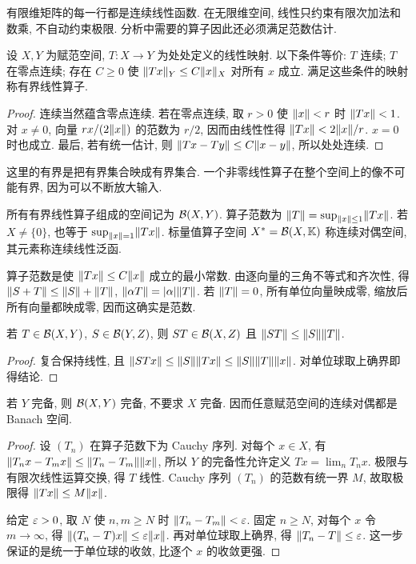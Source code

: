 \label{ch:operators}
有限维矩阵的每一行都是连续线性函数. 在无限维空间, 线性只约束有限次加法和数乘, 不自动约束极限. 分析中需要的算子因此还必须满足范数估计.

\begin{theorem}\label{thm:bounded}
设 $X,Y$ 为赋范空间, $T:X\to Y$ 为处处定义的线性映射. 以下条件等价: $T$ 连续; $T$ 在零点连续; 存在 $C\ge0$ 使 $\lVert Tx\rVert_Y\le C\lVert x\rVert_X$ 对所有 $x$ 成立. 满足这些条件的映射称有界线性算子.
\end{theorem}
\begin{proof}
连续当然蕴含零点连续. 若在零点连续, 取 $r>0$ 使 $\lVert x\rVert<r$ 时 $\lVert Tx\rVert<1$. 对 $x\ne0$, 向量 $rx/(2\lVert x\rVert)$ 的范数为 $r/2$, 因而由线性性得 $\lVert Tx\rVert<2\lVert x\rVert/r$. $x=0$ 时也成立. 最后, 若有统一估计, 则 $\lVert Tx-Ty\rVert\le C\lVert x-y\rVert$, 所以处处连续.
\end{proof}
这里的有界是把有界集合映成有界集合. 一个非零线性算子在整个空间上的像不可能有界, 因为可以不断放大输入.

\begin{definition}
所有有界线性算子组成的空间记为 $\mathcal B(X,Y)$. 算子范数为 $\lVert T\rVert=\sup_{\lVert x\rVert\le1}\lVert Tx\rVert$. 若 $X\ne\{0\}$, 也等于 $\sup_{\lVert x\rVert=1}\lVert Tx\rVert$. 标量值算子空间 $X^*=\mathcal B(X,\mathbb K)$ 称连续对偶空间, 其元素称连续线性泛函.
\end{definition}
算子范数是使 $\lVert Tx\rVert\le C\lVert x\rVert$ 成立的最小常数. 由逐向量的三角不等式和齐次性, 得 $\lVert S+T\rVert\le\lVert S\rVert+\lVert T\rVert$, $\lVert \alpha T\rVert=|\alpha|\lVert T\rVert$. 若 $\lVert T\rVert=0$, 所有单位向量映成零, 缩放后所有向量都映成零, 因而这确实是范数.

\begin{proposition}\label{prop:composition}
若 $T\in\mathcal B(X,Y)$, $S\in\mathcal B(Y,Z)$, 则 $ST\in\mathcal B(X,Z)$ 且 $\lVert ST\rVert\le\lVert S\rVert\lVert T\rVert$.
\end{proposition}
\begin{proof}
复合保持线性, 且 $\lVert STx\rVert\le\lVert S\rVert\lVert Tx\rVert\le\lVert S\rVert\lVert T\rVert\lVert x\rVert$. 对单位球取上确界即得结论.
\end{proof}

\begin{theorem}\label{thm:operatorbanach}
若 $Y$ 完备, 则 $\mathcal B(X,Y)$ 完备, 不要求 $X$ 完备. 因而任意赋范空间的连续对偶都是 Banach 空间.
\end{theorem}
\begin{proof}
设 $(T_n)$ 在算子范数下为 Cauchy 序列. 对每个 $x\in X$, 有 $\lVert T_nx-T_mx\rVert\le\lVert T_n-T_m\rVert\lVert x\rVert$, 所以 $Y$ 的完备性允许定义 $Tx=\lim_nT_nx$. 极限与有限次线性运算交换, 得 $T$ 线性. Cauchy 序列 $(T_n)$ 的范数有统一界 $M$, 故取极限得 $\lVert Tx\rVert\le M\lVert x\rVert$.

给定 $\varepsilon>0$, 取 $N$ 使 $n,m\ge N$ 时 $\lVert T_n-T_m\rVert<\varepsilon$. 固定 $n\ge N$, 对每个 $x$ 令 $m\to\infty$, 得 $\lVert (T_n-T)x\rVert\le\varepsilon\lVert x\rVert$. 再对单位球取上确界, 得 $\lVert T_n-T\rVert\le\varepsilon$. 这一步保证的是统一于单位球的收敛, 比逐个 $x$ 的收敛更强.
\end{proof}

